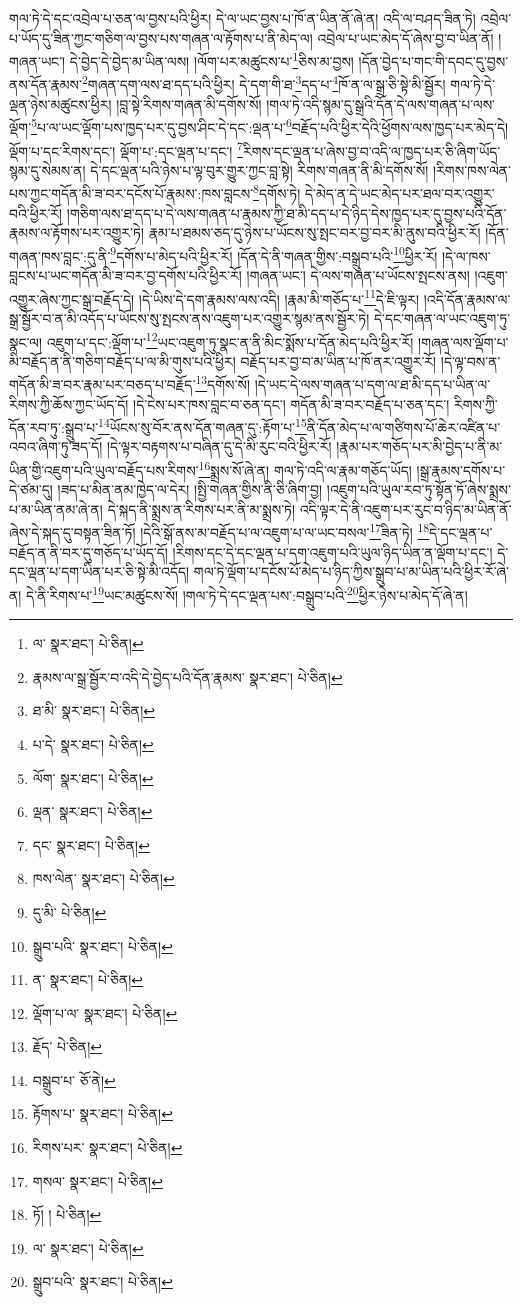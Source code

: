 གལ་ཏེ་དེ་དང་འབྲེལ་པ་ཅན་ལ་བྱས་པའི་ཕྱིར། དེ་ལ་ཡང་བྱས་པ་ཁོ་ན་ཡིན་ནོ་ཞེ་ན། འདི་ལ་བཤད་ཟིན་ཏེ། འབྲེལ་པ་ཡོད་དུ་ཟིན་ཀྱང་གཅིག་ལ་བྱས་པས་གཞན་ལ་རྟོགས་པ་ནི་མེད་ལ། འབྲེལ་པ་ཡང་མེད་དོ་ཞེས་བྱ་བ་ཡིན་ནོ། །གཞན་ཡང་། དེ་བྱེད་དེ་བྱེད་མ་ཡིན་ལས། །ལོག་པར་མཚུངས་པ་\footnote{ལ་  སྣར་ཐང་།  པེ་ཅིན། }ཅིས་མ་བྱས། །དོན་བྱེད་པ་གང་གི་དབང་དུ་བྱས་ནས་དོན་རྣམས་\footnote{རྣམས་ལ་སྒྲ་སྦྱོར་བ་འདི་དེ་བྱེད་པའི་དོན་རྣམས་  སྣར་ཐང་།  པེ་ཅིན། }གཞན་དག་ལས་ཐ་དད་པའི་ཕྱིར། དེ་དག་གི་ཐ་\footnote{ཐ་མི་  སྣར་ཐང་།  པེ་ཅིན། }དད་པ་\footnote{པ་དེ་  སྣར་ཐང་།  པེ་ཅིན། }ཁོ་ན་ལ་སྒྲ་ཅི་སྟེ་མི་སྦྱོར། གལ་ཏེ་དེ་ལྡན་ཉེས་མཚུངས་ཕྱིར། །བླ་སྟེ་རིགས་གཞན་མི་དགོས་སོ། །གལ་ཏེ་འདི་སྙམ་དུ་སྒྲའི་དོན་དེ་ལས་གཞན་པ་ལས་ལྡོག་\footnote{ལོག་  སྣར་ཐང་།  པེ་ཅིན། }པ་ལ་ཡང་ལྡོག་པས་ཁྱད་པར་དུ་བྱས་ཤིང་དེ་དང་:ལྡན་པ་\footnote{ལྡན་  སྣར་ཐང་།  པེ་ཅིན། }བརྗོད་པའི་ཕྱིར་དེའི་ཕྱོགས་ལས་ཁྱད་པར་མེད་དེ། ལྡོག་པ་དང་རིགས་དང་། ལྡོག་པ་:དང་ལྡན་པ་དང་། \footnote{དང་  སྣར་ཐང་།  པེ་ཅིན། }རིགས་དང་ལྡན་པ་ཞེས་བྱ་བ་འདི་ལ་ཁྱད་པར་ཅི་ཞིག་ཡོད་སྙམ་དུ་སེམས་ན། དེ་དང་ལྡན་པའི་ཉེས་པ་ལྟ་བུར་གྱུར་ཀྱང་བླ་སྟེ། རིགས་གཞན་ནི་མི་དགོས་སོ། །རིགས་ཁས་ལེན་པས་ཀྱང་གདོན་མི་ཟ་བར་དངོས་པོ་རྣམས་:ཁས་བླངས་\footnote{ཁས་ལེན་  སྣར་ཐང་།  པེ་ཅིན། }དགོས་ཏེ། དེ་མེད་ན་དེ་ཡང་མེད་པར་ཐལ་བར་འགྱུར་བའི་ཕྱིར་རོ། །གཅིག་ལས་ཐ་དད་པ་དེ་ལས་གཞན་པ་རྣམས་ཀྱི་ཐ་མི་དད་པ་དེ་ཉིད་དེས་ཁྱད་པར་དུ་བྱས་པའི་དོན་རྣམས་ལ་རྟོགས་པར་འགྱུར་ཏེ། རྣམ་པ་ཐམས་ཅད་དུ་ཉེས་པ་ཡོངས་སུ་སྤང་བར་བྱ་བར་མི་ནུས་བའི་ཕྱིར་རོ། །དོན་གཞན་ཁས་བླང་:དུ་ནི་\footnote{དུ་མི་  པེ་ཅིན། }དགོས་པ་མེད་པའི་ཕྱིར་རོ། །དོན་དེ་ནི་གཞན་གྱིས་:བསྒྲུབ་པའི་\footnote{སྒྲུབ་པའི་  སྣར་ཐང་།  པེ་ཅིན། }ཕྱིར་རོ། །དེ་ལ་ཁས་བླངས་པ་ཡང་གདོན་མི་ཟ་བར་བྱ་དགོས་པའི་ཕྱིར་རོ། །གཞན་ཡང་། དེ་ལས་གཞན་པ་ཡོངས་སྤངས་ནས། །འཇུག་འགྱུར་ཞེས་ཀྱང་སྒྲ་བརྗོད་དེ། །དེ་ཡིས་དེ་དག་རྣམས་ལས་འདི། །རྣམ་མི་གཅོད་པ་\footnote{ན་  སྣར་ཐང་།  པེ་ཅིན། }དེ་ཇི་ལྟར། །འདི་དོན་རྣམས་ལ་སྒྲ་སྦྱོར་བ་ན་མི་འདོད་པ་ཡོངས་སུ་སྤངས་ནས་འཇུག་པར་འགྱུར་སྙམ་ནས་སྦྱོར་ཏེ། དེ་དང་གཞན་ལ་ཡང་འཇུག་ཏུ་སྣང་ལ། འཇུག་པ་དང་:ལྡོག་པ་\footnote{ལྡོག་པ་ལ་  སྣར་ཐང་།  པེ་ཅིན། }ཡང་འཇུག་ཏུ་སྣང་ན་ནི་མིང་སྨོས་པ་དོན་མེད་པའི་ཕྱིར་རོ། །གཞན་ལས་ལྡོག་པ་མི་བརྗོད་ན་ནི་གཅིག་བརྗོད་པ་ལ་མི་གུས་པའི་ཕྱིར། བརྗོད་པར་བྱ་བ་མ་ཡིན་པ་ཁོ་ནར་འགྱུར་རོ། །དེ་ལྟ་བས་ན་གདོན་མི་ཟ་བར་རྣམ་པར་བཅད་པ་བརྗོད་\footnote{རྗོད་  པེ་ཅིན། }དགོས་སོ། །དེ་ཡང་དེ་ལས་གཞན་པ་དག་ལ་ཐ་མི་དད་པ་ཡིན་ལ་རིགས་ཀྱི་ཆོས་ཀྱང་ཡོད་དོ། །དེ་ངེས་པར་ཁས་བླང་བ་ཅན་དང་། གདོན་མི་ཟ་བར་བརྗོད་པ་ཅན་དང་། རིགས་ཀྱི་དོན་རབ་ཏུ་:སྒྲུབ་པ་\footnote{བསྒྲུབ་པ་  ཅོ་ནེ། }ཡོངས་སུ་བོར་ནས་དོན་གཞན་དུ་:རྟོག་པ་\footnote{རྟོགས་པ་  སྣར་ཐང་།  པེ་ཅིན། }ནི་དོན་མེད་པ་ལ་གཙིགས་པོ་ཆེར་འཛིན་པ་འབའ་ཞིག་ཏུ་ཟད་དོ། །དེ་ལྟར་བརྟགས་པ་བཞིན་དུ་དེ་མི་རུང་བའི་ཕྱིར་རོ། །རྣམ་པར་གཅོད་པར་མི་བྱེད་པ་ནི་མ་ཡིན་གྱི་འཇུག་པའི་ཡུལ་བརྗོད་པས་རིགས་\footnote{རིགས་པར་  སྣར་ཐང་།  པེ་ཅིན། }སྨྲས་སོ་ཞེ་ན། གལ་ཏེ་འདི་ལ་རྣམ་གཅོད་ཡོད། །སྒྲ་རྣམས་དགོས་པ་དེ་ཙམ་དུ། །ཟད་པ་མིན་ནམ་ཁྱེད་ལ་དེར། །སྤྱི་གཞན་གྱིས་ནི་ཅི་ཞིག་བྱ། །འཇུག་པའི་ཡུལ་རབ་ཏུ་སྟོན་ཏོ་ཞེས་སྨྲས་པ་མ་ཡིན་ནམ་ཞེ་ན། དེ་སྐད་ནི་སྨྲས་ན་རིགས་པར་ནི་མ་སྨྲས་ཏེ། འདི་ལྟར་དེ་ནི་འཇུག་པར་རུང་བ་ཉིད་མ་ཡིན་ནོ་ཞེས་དེ་སྐད་དུ་བསྟན་ཟིན་ཏོ། །དེའི་སྒོ་ནས་མ་བརྗོད་པ་ལ་འཇུག་པ་ལ་ཡང་བསལ་\footnote{གསལ་  སྣར་ཐང་།  པེ་ཅིན། }ཟིན་ཏེ། \footnote{ཏོ། །   པེ་ཅིན། }དེ་དང་ལྡན་པ་བརྗོད་ན་ནི་བར་དུ་གཅོད་པ་ཡོད་དོ། །རིགས་དང་དེ་དང་ལྡན་པ་དག་འཇུག་པའི་ཡུལ་ཉིད་ཡིན་ན་ལྡོག་པ་དང་། དེ་དང་ལྡན་པ་དག་ཡིན་པར་ཅི་སྟེ་མི་འདོད། གལ་ཏེ་ལྡོག་པ་དངོས་པོ་མེད་པ་ཉིད་ཀྱིས་སྒྲུབ་པ་མ་ཡིན་པའི་ཕྱིར་རོ་ཞེ་ན། དེ་ནི་རིགས་པ་\footnote{ལ་  སྣར་ཐང་།  པེ་ཅིན། }ཡང་མཚུངས་སོ། །གལ་ཏེ་དེ་དང་ལྡན་པས་:བསྒྲུབ་པའི་\footnote{སྒྲུབ་པའི་  སྣར་ཐང་།  པེ་ཅིན། }ཕྱིར་ཉེས་པ་མེད་དོ་ཞེ་ན། 